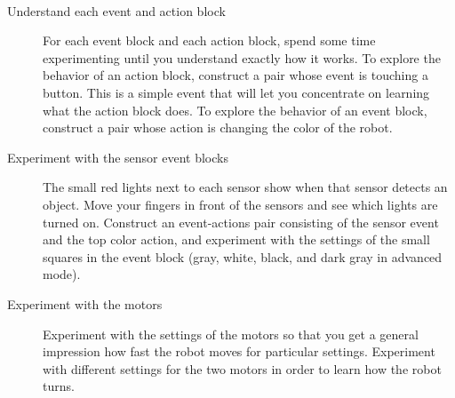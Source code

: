
\label{a.tips}

\
\begin{description}

\item[Understand each event and action block] For each event block and
each action block, spend some time experimenting until you understand
exactly how it works. To explore the behavior of an action block,
construct a pair whose event is touching a button. This is a simple
event that will let you concentrate on learning what the action block
does. To explore the behavior of an event block, construct a pair whose
action is changing the color of the robot.

\item[Experiment with the sensor event blocks] The small red lights next
to each sensor show when that sensor detects an object. Move your
fingers in front of the sensors and see which lights are turned on.
Construct an event-actions pair consisting of the sensor event and the
top color action, and experiment with the settings of the small squares
in the event block (gray, white, black, and dark gray in advanced mode).

\item[Experiment with the motors] Experiment with the settings of the
motors so that you get a general impression how fast the robot moves for
particular settings. Experiment with different settings for the two
motors in order to learn how the robot turns.

\end{description}



